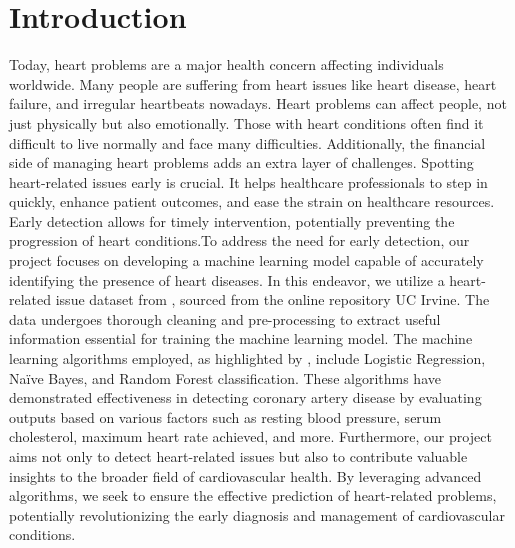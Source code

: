 \chapter{Introduction}
\label{ch:into} %
Today, heart problems are a major health concern affecting individuals worldwide. Many people are suffering from heart issues like heart disease, heart failure, and irregular heartbeats nowadays. Heart problems can affect people, not just physically but also emotionally. Those with heart conditions often find it difficult to live normally and face many difficulties. Additionally, the financial side of managing heart problems adds an extra layer of challenges. Spotting heart-related issues early is crucial. It helps healthcare professionals to step in quickly, enhance patient outcomes, and ease the strain on healthcare resources. Early detection allows for timely intervention, potentially preventing the progression of heart conditions.To address the need for early detection, our project focuses on developing a machine learning model capable of accurately identifying the presence of heart diseases. In this endeavor, we utilize a heart-related issue dataset from \citep{janosi-1988}, sourced from the online repository UC Irvine. The data undergoes thorough cleaning and pre-processing to extract useful information essential for training the machine learning model. The machine learning algorithms employed, as highlighted by \citep{Sharma-2020}, include Logistic Regression, Naïve Bayes, and Random Forest classification. These algorithms have demonstrated effectiveness in detecting coronary artery disease by evaluating outputs based on various factors such as resting blood pressure, serum cholesterol, maximum heart rate achieved, and more. Furthermore, our project aims not only to detect heart-related issues but also to contribute valuable insights to the broader field of cardiovascular health. By leveraging advanced algorithms, we seek to ensure the effective prediction of heart-related problems, potentially revolutionizing the early diagnosis and management of cardiovascular conditions.
